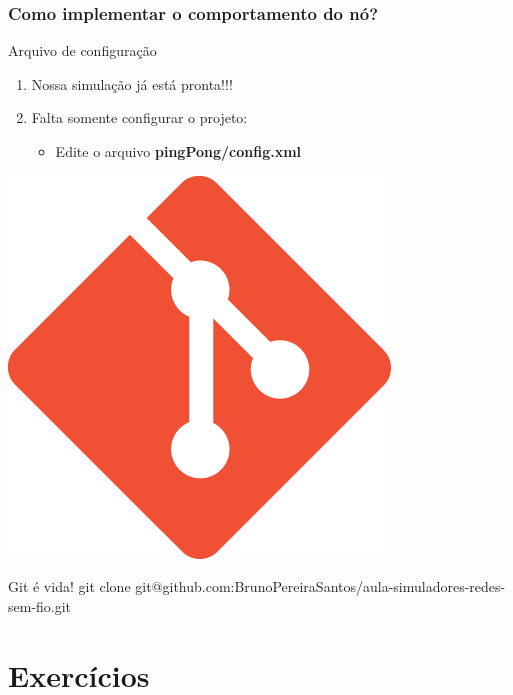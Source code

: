 \documentclass{beamer}
\begin{document}
\begin{frame}
	\frametitle{Como implementar o comportamento do nó?}
	
	\begin{block}{Arquivo de configuração}
		\begin{enumerate}
			\item Nossa simulação já está pronta!!!
			\item Falta somente configurar o projeto:
			\begin{itemize}
				\item Edite o arquivo \textbf{pingPong/config.xml}
			\end{itemize}
		\end{enumerate}
	\end{block}	
	
	
\end{frame}

\begin{frame}
\tiny
	
\end{frame}

\begin{frame}
\footnotesize
\centering

	\includegraphics[width=0.22\linewidth]{img/git.png}
	\begin{exampleblock}{Git é vida!}
		git clone git@github.com:BrunoPereiraSantos/aula-simuladores-redes-sem-fio.git
	\end{exampleblock}
	
\end{frame}
\section{Exercícios} %
\end{document}
